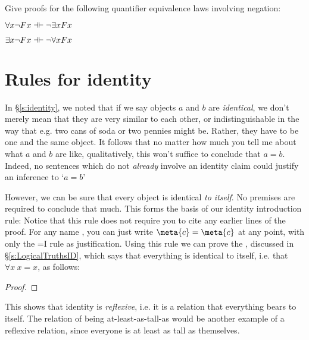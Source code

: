 \

\problempart Give proofs for the following quantifier equivalence laws involving negation:

\begin{earg}
\item $\forall x \enot Fx \pequiv \enot \exists xFx$
\item $\exists x \enot Fx \pequiv \enot \forall x Fx$
\end{earg}




\section{Rules for identity}\label{s:identityrules}

In \S\ref{s:identity}, we noted that if we say objects $a$ and $b$ are \emph{identical}, we don't merely mean that they are very similar to each other, or indistinguishable in the way that e.g. two cans of soda or two pennies might be. Rather, they have to be one and the same object. It follows that no matter how much you tell me about what  $a$ and $b$ are like, qualitatively, this won't suffice to conclude that $a=b$.  Indeed, no sentences which do not \emph{already} involve an identity claim could justify an inference to `$a=b$'


However, we can be sure that every object is identical \emph{to itself}. No premises are required to conclude that much. This forms the basis of our identity introduction rule:
Notice that this rule does not require you to cite any earlier lines of the proof. For any name , you can just write $\meta{c}=\meta{c}$ at any point, with only the {=}I rule as justification.  Using this rule we can prove the , discussed in \S\ref{s:LogicalTruthsID}, which says that everything is identical to itself, i.e. that $\forall x \ x = x$, as follows:

\begin{proof}
\open
	 \fl{}
	 
\close
{} 
\end{proof}
This shows that identity is \emph{reflexive}, i.e. it is a relation that everything bears to itself.  The relation of being at-least-as-tall-as would be another example of a reflexive relation, since everyone is at least as tall as themselves. 

